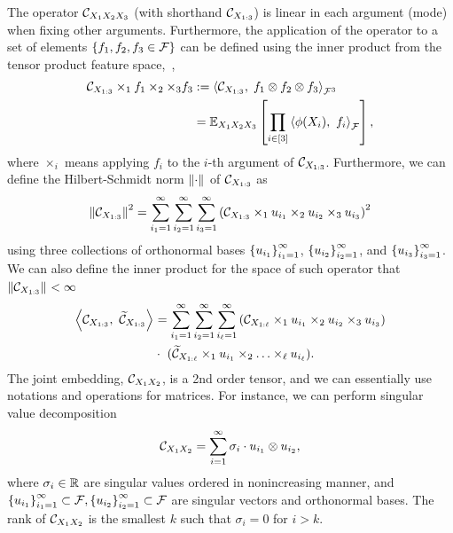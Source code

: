 \documentclass{article}
\begin{document}
The operator $\mathcal{C}_{X_1X_2X_3}$ (with shorthand $\mathcal{C}_{X_{1:3}}$) is linear in each argument (mode) when fixing other arguments. Furthermore, the application of the operator to a set of elements $\left\{f_1,f_2,f_3 \in \mathcal{F}\right\}$ can be defined using the inner product from the tensor product feature space,~\ie,
\begin{align}
	\mathcal{C}_{X_{1:3}} \times_1 f_1 \times_2 \times_3 f_3
	&:= 	\left\langle \mathcal{C}_{X_{1:3}},\;f_1\otimes f_2\otimes f_3 \right\rangle_{\mathcal{F}^3} \nonumber \\
	&=\mathbb{E}_{X_1X_2X_3}\left[\prod_{i \in [3]} \left\langle \phi(X_i),~f_i \right\rangle_{\mathcal{F}}\right], \nonumber
\end{align}
where $\times_i$ means applying $f_i$ to the $i$-th argument of $\mathcal{C}_{X_{1:3}}$. Furthermore, we can define the Hilbert-Schmidt norm $\left\|\cdot\right\|_{}$ of $\mathcal{C}_{X_{1:3}}$ as
\[
 \left\|\mathcal{C}_{X_{1:3}}\right\|_{}^2 = \sum_{i_1 = 1}^\infty \sum_{i_2 = 1}^\infty \sum_{i_3 = 1}^\infty \left(\mathcal{C}_{X_{1:3}} \times_1 u_{i_1} \times_2 u_{i_2} \times_3 u_{i_3}\right)^2
\]
using three collections of orthonormal bases $\left\{u_{i_1}\right\}_{i_1=1}^\infty$, $\left\{u_{i_2}\right\}_{i_2=1}^\infty$, and $\left\{u_{i_3}\right\}_{i_3=1}^\infty$. We can also define the inner product for the space of such operator that $\left\|\mathcal{C}_{X_{1:3}}\right\|_{}<\infty$
\begin{align}
	\left\langle \mathcal{C}_{X_{1:3}},~\widetilde{\mathcal{C}}_{X_{1:3}} \right\rangle_{}  &=  \sum_{i_1 = 1}^\infty \sum_{i_2 = 1}^\infty \sum_{i_\ell = 1}^\infty \left(\mathcal{C}_{X_{1:\ell}} \times_1 u_{i_1} \times_2 u_{i_2} \times_3 u_{i_3}\right) \nonumber \\
	& \cdot\ (\widetilde{\mathcal{C}}_{X_{1:\ell}} \times_1 u_{i_1} \times_2 \ldots \times_\ell u_{i_\ell}). \nonumber
\end{align}
%
The joint embedding, $\mathcal{C}_{X_1 X_2}$, is a 2nd order tensor, and we can essentially use notations and operations for matrices. For instance, we can perform singular value decomposition
\[
    \mathcal{C}_{X_1X_2} = \sum_{i=1}^{\infty} \sigma_i \cdot u_{i_1} \otimes u_{i_2},
\]
where $\sigma_i \in \mathbb{R}$ are singular values ordered in nonincreasing manner, and $\left\{u_{i_1}\right\}_{i_1=1}^{\infty} \subset \mathcal{F}, \left\{u_{i_2}\right\}_{i_2=1}^{\infty} \subset \mathcal{F}$ are singular vectors and orthonormal bases. The rank of $\mathcal{C}_{X_1X_2}$ is the smallest $k$ such that $\sigma_i = 0$ for $i > k$.
\end{document}
